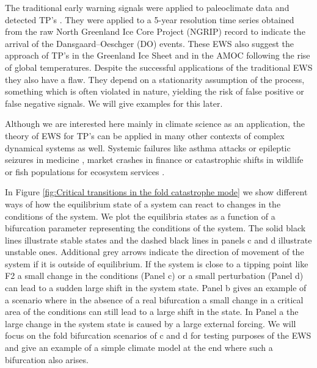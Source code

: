 \documentclass[%
thesis=student,%
coverpage=false,%
titlepage=false,%
headmarks=true, %
english,%
font=libertine, %
math=newpxtx, %
BCOR=5mm,%
coverBCOR=11mm%
]{tumbook}
\begin{document}
The traditional early warning signals were applied to paleoclimate data and detected TP's \cite{Boers:2018}. They were applied to a 5-year resolution time series obtained from the raw North Greenland Ice Core Project (NGRIP) record to indicate the arrival of the Dansgaard–Oeschger (DO) events. These EWS also suggest the approach of TP's in the Greenland Ice Sheet \cite{Boers:2021} and in the AMOC  \cite{Boers:2021b} following the rise of global temperatures. Despite the successful applications of the traditional EWS they also have a flaw. They depend on a stationarity assumption of the process, something which is often violated in nature, yielding the risk of false positive or false negative signals. We will give examples for this later. 

Although we are interested here mainly in climate science as an application, the theory of EWS for TP's can be applied in many other contexts of complex dynamical systems as well. Systemic failures like asthma attacks \cite{Venegas:2005} or epileptic seizures in medicine \cite{Litt:2001, McSharry:2003}, market crashes in finance \cite{Kambhu:2007,May:2008} or catastrophic shifts in wildlife or fish populations for ecosystem services \cite{Scheffer:2001, MillenniumEcosystemAssessment:2005}. 

In Figure \ref{fig:Critical transitions in the fold catastrophe mode} we show different ways of how the equilibrium state of a system can react to changes in the conditions of the system. We plot the equilibria states as a function of a bifurcation parameter representing the conditions of the system. The solid black lines illustrate stable states and the dashed black lines in panels c and d illustrate unstable ones. Additional grey arrows indicate the direction of movement of the system if it is outside of equilibrium. If the system is close to a tipping point like F2 a small change in the conditions (Panel c) or a small perturbation (Panel d) can lead to a sudden large shift in the system state. Panel b gives an example of a scenario where in the absence of a real bifurcation a small change in a critical area of the conditions can still lead to a large shift in the state. In Panel a the large change in the system state is caused by a large external forcing. We will focus on the fold bifurcation scenarios of c and d for testing purposes of the EWS and give an example of a simple climate model at the end where such a bifurcation also arises.


\end{document}
